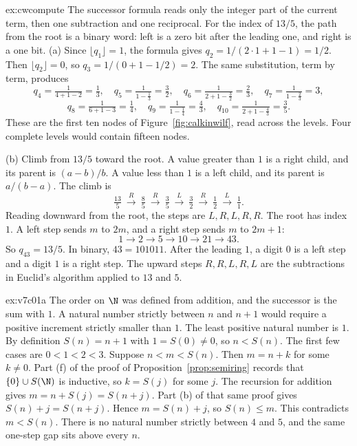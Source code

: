 \begin{solution}{ex:cwcompute}
\idea The successor formula reads only the integer part of the current term, then one subtraction and one reciprocal. For the index of $13/5$, the path from the root is a binary word: left is a zero bit after the leading one, and right is a one bit.
\writeup (a) Since $\lfloor q_1\rfloor=1$, the formula gives $q_2=1/(2\cdot 1+1-1)=1/2$. Then $\lfloor q_2\rfloor=0$, so $q_3=1/(0+1-1/2)=2$. The same substitution, term by term, produces
\[q_4=\tfrac1{4+1-2}=\tfrac13,\quad q_5=\tfrac1{1-\frac13}=\tfrac32,\quad q_6=\tfrac1{2+1-\frac32}=\tfrac23,\quad q_7=\tfrac1{1-\frac23}=3,\]
\[q_8=\tfrac1{6+1-3}=\tfrac14,\quad q_9=\tfrac1{1-\frac14}=\tfrac43,\quad q_{10}=\tfrac1{2+1-\frac43}=\tfrac35.\]
These are the first ten nodes of Figure~\ref{fig:calkinwilf}, read across the levels. Four complete levels would contain fifteen nodes.

(b) Climb from $13/5$ toward the root. A value greater than $1$ is a right child, and its parent is $(a-b)/b$. A value less than $1$ is a left child, and its parent is $a/(b-a)$. The climb is
\[\tfrac{13}5\ \xrightarrow{R}\ \tfrac85\ \xrightarrow{R}\ \tfrac35\ \xrightarrow{L}\ \tfrac32\ \xrightarrow{R}\ \tfrac12\ \xrightarrow{L}\ \tfrac11.\]
Reading downward from the root, the steps are $L,R,L,R,R$. The root has index $1$. A left step sends $m$ to $2m$, and a right step sends $m$ to $2m+1$:
\[
1\to 2\to 5\to 10\to 21\to 43.
\]
So $q_{43}=13/5$. In binary, $43=101011$. After the leading $1$, a digit $0$ is a left step and a digit $1$ is a right step. The upward steps $R,R,L,R,L$ are the subtractions in Euclid's algorithm applied to $13$ and $5$.
\end{solution}

\begin{solution}{ex:v7c01a}
\idea The order on $\N$ was defined from addition, and the successor is the sum with $1$. A natural number strictly between $n$ and $n+1$ would require a positive increment strictly smaller than $1$. The least positive natural number is $1$.
\writeup By definition $S(n)=n+1$ with $1=S(0)\ne 0$, so $n<S(n)$. The first few cases are $0<1<2<3$. Suppose $n<m<S(n)$. Then $m=n+k$ for some $k\ne 0$. Part (f) of the proof of Proposition~\ref{prop:semiring} records that $\{0\}\cup S(\N)$ is inductive, so $k=S(j)$ for some $j$. The recursion for addition gives $m=n+S(j)=S(n+j)$. Part (b) of that same proof gives $S(n)+j=S(n+j)$. Hence $m=S(n)+j$, so $S(n)\le m$. This contradicts $m<S(n)$. There is no natural number strictly between $4$ and $5$, and the same one-step gap sits above every $n$.
\end{solution}

